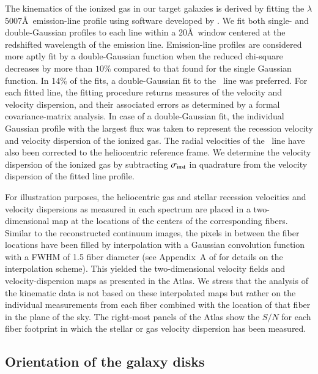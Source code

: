 \documentclass[traditabstract]{aa} %
\begin{document}
The kinematics of the ionized gas in our target galaxies is derived by fitting
the \oiii$\lambda$5007\AA\ emission-line profile using software developed by
\citet{andersen2006, andersen2008}.  We fit both single- and double-Gaussian
profiles to each line within a 20\AA\ window centered at the redshifted
wavelength of the emission line. Emission-line profiles are considered more
aptly fit by a double-Gaussian function when the reduced chi-square decreases by
more than $10\%$ compared to that found for the single Gaussian function.  In
14\% of the fits, a double-Gaussian fit to the \oiii\ line was preferred.  For
each fitted line, the fitting procedure returns measures of the velocity and
velocity dispersion, and their associated errors as determined by a formal
covariance-matrix analysis.  In case of a double-Gaussian fit, the individual
Gaussian profile with the largest flux was taken to represent the recession
velocity and velocity dispersion of the ionized gas. The radial velocities of
the \oiii\ line have also been corrected to the heliocentric reference frame.
We determine the velocity dispersion of the ionized gas by subtracting $\sigma_{\rm inst}$
in quadrature from the velocity dispersion of the fitted line profile.

For illustration purposes, the heliocentric gas and stellar recession velocities
and velocity dispersions as measured in each spectrum are placed in a
two-dimensional map at the locations of the centers of the corresponding fibers.
Similar to the reconstructed continuum images, the pixels in between the fiber
locations have been filled by interpolation with a Gaussian convolution function
with a FWHM of 1.5 fiber diameter (see Appendix~A of
 for details on the interpolation scheme).  This
yielded the two-dimensional velocity fields and velocity-dispersion maps as
presented in the Atlas.  We stress that the analysis of the kinematic data is
not based on these interpolated maps but rather on the individual measurements
from each fiber combined with the location of that fiber in the plane of the
sky. The right-most panels of the Atlas show the $S/N$ for each fiber footprint
in which the stellar or gas velocity dispersion has been measured.


\subsection{Orientation of the galaxy disks}
\label{sec:orientation}
\end{document}
